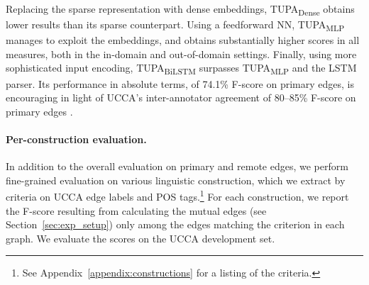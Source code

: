 \documentclass[11pt,a4paper]{article}
\newcommand{\parser}[1]{TUPA\textsubscript{#1}}
\newcommand{\secref}[1]{Section~\ref{#1}}
\begin{document}
Replacing the sparse representation with dense embeddings, \parser{Dense} obtains
lower results than its sparse counterpart.
Using a feedforward NN, \parser{MLP} manages to exploit the embeddings,
and obtains substantially higher scores in all measures, both
in the in-domain and out-of-domain settings.
Finally, using more sophisticated input encoding, \parser{BiLSTM} surpasses \parser{MLP}
and the LSTM parser.
Its performance in absolute terms, of 74.1\% F-score on primary edges, is encouraging in light of
UCCA's inter-annotator agreement of 80--85\%
F-score on primary edges \cite{abend2013universal}.




\paragraph{Per-construction evaluation.}

In addition to the overall evaluation on primary and remote edges,
we perform fine-grained evaluation on various linguistic construction,
which we extract by criteria on UCCA edge labels and POS tags.\footnote{See
Appendix~\ref{appendix:constructions} for a listing of the criteria.}
For each construction, we report the F-score resulting from calculating the
mutual edges (see \secref{sec:exp_setup}) only among the edges matching the
criterion in each graph. We evaluate the scores on the UCCA development set.
\end{document}

